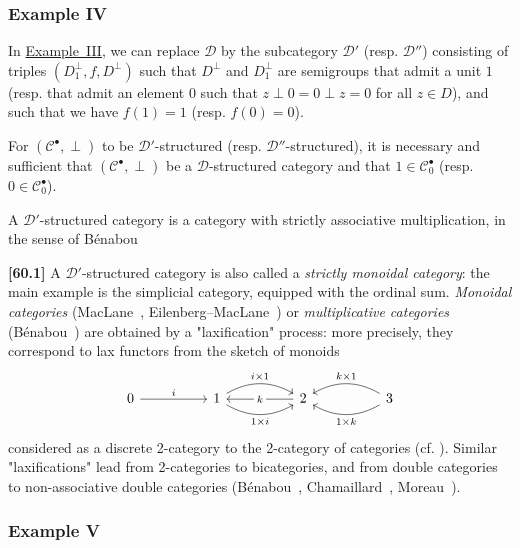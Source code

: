 \documentclass[a4paper,fleqn]{article}
\theoremstyle{plain}
\theoremstyle{definition}
\newenvironment{longcomm}[1]
  {\noindent\textbf{[#1]}\rmfamily}
  {}
\newcommand{\oldpage}[1]{{\marginpar{\footnotesize$\bigg\vert$\,\,\,\,\textit{p.~#1}}}}
\newcommand{\CC}{\mathcal{C}}
\newcommand{\DD}{\mathcal{D}}
\newcommand{\smallbullet}{\bullet}
\begin{document}
\subsubsection*{Example IV}
\label{section:ii.3.iv}

\oldpage{388}
In \hyperref[section:ii.3.iii]{Example~III}, we can replace $\DD$ by the subcategory $\DD'$ (resp. $\DD''$) consisting of triples $(D_1^\perp,f,D^\perp)$ such that $D^\perp$ and $D_1^\perp$ are semigroups that admit a unit $1$ (resp. that admit an element $0$ such that $z\perp0=0\perp z=0$ for all $z\in D$), and such that we have $f(1)=1$ (resp. $f(0)=0$).

For $(\CC^\smallbullet,\perp)$ to be $\DD'$-structured (resp. $\DD''$-structured), it is necessary and sufficient that $(\CC^\smallbullet,\perp)$ be a $\DD$-structured category and that $1\in\CC_0^\smallbullet$ (resp. $0\in\CC_0^\smallbullet$).

A $\DD'$-structured category is a category with strictly associative multiplication, in the sense of Bénabou~\cite{comm1}

\begin{longcomm}{60.1}
  A $\DD'$-structured category is also called a \emph{strictly monoidal category}: the main example is the simplicial category, equipped with the ordinal sum.
  \emph{Monoidal categories} (MacLane~\cite{comm71}, Eilenberg–MacLane~\cite{comm32}) or \emph{multiplicative categories} (Bénabou~\cite{comm4}) are obtained by a "laxification" process: more precisely, they correspond to lax functors from the sketch of monoids
  \[
    \begin{tikzcd}[sep=huge]
      0
        \ar[r,"i"]
      & 1
        \ar[r,bend left=30,"i\times1"]
        \ar[r,bend right=30,swap,"1\times i"]
      & 2
        \ar[l,"k"description]
      & 3
        \ar[l,bend left=30,"1\times k"]
        \ar[l,bend right=30,swap,"k\times1"]
    \end{tikzcd}
  \]
  considered as a discrete 2-category to the 2-category of categories (cf. \cite{coll117}).
  Similar "laxifications" lead from 2-categories to bicategories, and from double categories to non-associative double categories (Bénabou~\cite{comm6}, Chamaillard~\cite{comm20}, Moreau~\cite{comm78}).
\end{longcomm}


\subsubsection*{Example V}
\label{section:ii.3.v}
\end{document}
